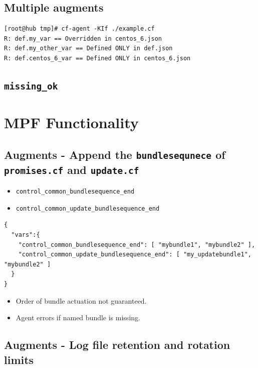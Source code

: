 \documentclass[11pt]{article}
\begin{document}
\subsection*{Multiple augments}
\label{sec:org77c0e35}

\begin{verbatim}
[root@hub tmp]# cf-agent -KIf ./example.cf 
R: def.my_var == Overridden in centos_6.json
R: def.my_other_var == Defined ONLY in def.json
R: def.centos_6_var == Defined ONLY in centos_6.json
\end{verbatim}

\subsection*{\texttt{missing\_ok}}
\label{sec:org8ee3217}
\section*{MPF Functionality}
\label{sec:orga7af1b8}
\subsection*{Augments - Append the \texttt{bundlesequnece} of \texttt{promises.cf} and \texttt{update.cf}}
\label{sec:orgb1b3403}

\begin{itemize}
\item \texttt{control\_common\_bundlesequence\_end}
\item \texttt{control\_common\_update\_bundlesequence\_end}
\end{itemize}

\begin{verbatim}
{
  "vars":{
    "control_common_bundlesequence_end": [ "mybundle1", "mybundle2" ],
    "control_common_update_bundlesequence_end": [ "my_updatebundle1", "mybundle2" ]
  }
}
\end{verbatim}

\begin{itemize}
\item Order of bundle actuation not guaranteed.
\item Agent errors if named bundle is missing.
\end{itemize}

\subsection*{Augments - Log file retention and rotation limits}
\label{sec:orgaae6216}
\end{document}
